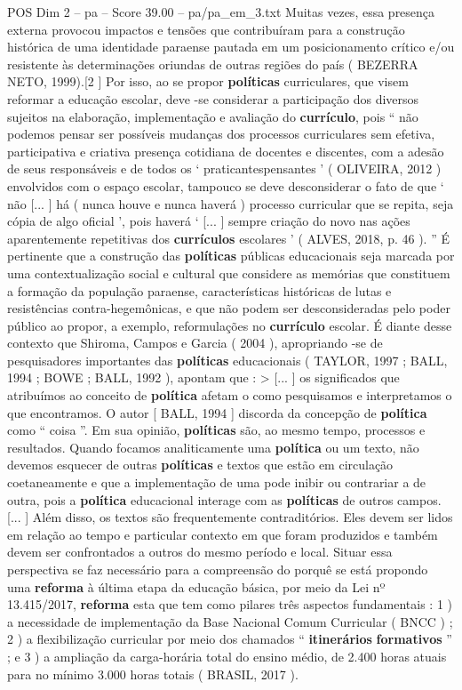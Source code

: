 \begin{textsample}{POS Dim 2 – pa – Score 39.00 – pa/pa\_em\_3.txt}
Muitas vezes, essa presença externa provocou impactos e tensões que contribuíram para a construção histórica de uma identidade paraense pautada em um posicionamento crítico e/ou resistente às determinações oriundas de outras regiões do país ( BEZERRA NETO, 1999).[2 ] Por isso, ao se propor \textbf{políticas} curriculares, que visem reformar a educação escolar, deve -se considerar a participação dos diversos sujeitos na elaboração, implementação e avaliação do \textbf{currículo}, pois “ não podemos pensar ser possíveis mudanças dos processos curriculares sem efetiva, participativa e criativa presença cotidiana de docentes e discentes, com a adesão de seus responsáveis e de todos os ‘ praticantespensantes ’ ( OLIVEIRA, 2012 ) envolvidos com o espaço escolar, tampouco se deve desconsiderar o fato de que ‘ não [... ] há ( nunca houve e nunca haverá ) processo curricular que se repita, seja cópia de algo oficial ’, pois haverá ‘ [... ] sempre criação do novo nas ações aparentemente repetitivas dos \textbf{currículos} escolares ’ ( ALVES, 2018, p. 46 ). ” É pertinente que a construção das \textbf{políticas} públicas educacionais seja marcada por uma contextualização social e cultural que considere as memórias que constituem a formação da população paraense, características históricas de lutas e resistências contra-hegemônicas, e que não podem ser desconsideradas pelo poder público ao propor, a exemplo, reformulações no \textbf{currículo} escolar.
É diante desse contexto que Shiroma, Campos e Garcia ( 2004 ), apropriando -se de pesquisadores importantes das \textbf{políticas} educacionais ( TAYLOR, 1997 ; BALL, 1994 ; BOWE ; BALL, 1992 ), apontam que : > [... ] os significados que atribuímos ao conceito de \textbf{política} afetam o como pesquisamos e interpretamos o que encontramos.
O autor [ BALL, 1994 ] discorda da concepção de \textbf{política} como “ coisa ”.
Em sua opinião, \textbf{políticas} são, ao mesmo tempo, processos e resultados.
Quando focamos analiticamente uma \textbf{política} ou um texto, não devemos esquecer de outras \textbf{políticas} e textos que estão em circulação coetaneamente e que a implementação de uma pode inibir ou contrariar a de outra, pois a \textbf{política} educacional interage com as \textbf{políticas} de outros campos. [... ] Além disso, os textos são frequentemente contraditórios.
Eles devem ser lidos em relação ao tempo e particular contexto em que foram produzidos e também devem ser confrontados a outros do mesmo período e local.
Situar essa perspectiva se faz necessário para a compreensão do porquê se está propondo uma \textbf{reforma} à última etapa da educação básica, por meio da Lei nº 13.415/2017, \textbf{reforma} esta que tem como pilares três aspectos fundamentais : 1 ) a necessidade de implementação da Base Nacional Comum Curricular ( BNCC ) ; 2 ) a flexibilização curricular por meio dos chamados “ \textbf{itinerários} \textbf{formativos} ” ; e 3 ) a ampliação da carga-horária total do ensino médio, de 2.400 horas atuais para no mínimo 3.000 horas totais ( BRASIL, 2017 ).

\end{textsample}
